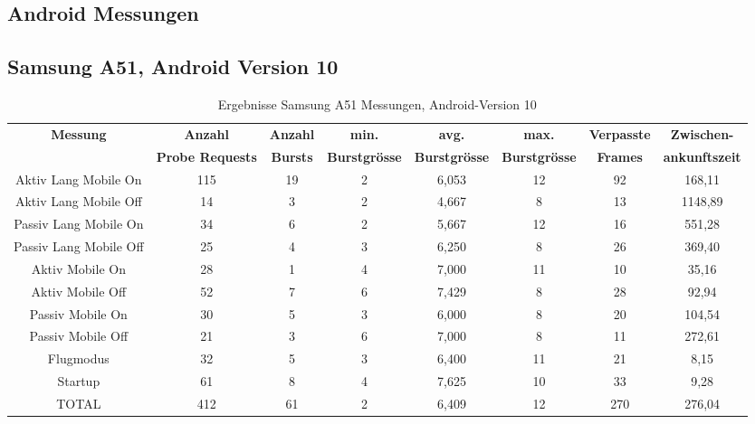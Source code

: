 \begin{landscape}
   \clearpage

   \section*{Android Messungen}
   \subsection*{Samsung A51, Android Version 10}
   \begin{table}[h!]
      \centering
      \begin{tabular}{|c|c|c|c|c|c|c|c|}
      \hline
      \textbf{Messung} & \textbf{Anzahl} & \textbf{Anzahl} & \textbf{min.} & \textbf{avg.} & \textbf{max.} & \textbf{Verpasste} & \textbf{Zwischen-}\\
      & \textbf{Probe Requests} & \textbf{Bursts} & \textbf{Burstgrösse} & \textbf{Burstgrösse} & \textbf{Burstgrösse} & \textbf{Frames} & \textbf{ankunftszeit}\\
      \hline
      Aktiv Lang Mobile On & 115 & 19 & 2 & 6,053 & 12 & \phantom{0}92 & \phantom{0}168,11 \\
      Aktiv Lang Mobile Off & \phantom{0}14 & \phantom{0}3 & 2 & 4,667 & \phantom{0}8 & \phantom{0}13 & 1148,89 \\
      Passiv Lang Mobile On & \phantom{0}34 & \phantom{0}6 & 2 & 5,667 & 12 & \phantom{0}16 & \phantom{0}551,28 \\
      Passiv Lang Mobile Off & \phantom{0}25 & \phantom{0}4 & 3 & 6,250 & \phantom{0}8 & \phantom{0}26 & \phantom{0}369,40 \\
      Aktiv Mobile On & \phantom{0}28 & \phantom{0}1 & 4 & 7,000 & 11 & \phantom{0}10 & \phantom{00}35,16 \\
      Aktiv Mobile Off & \phantom{0}52 & \phantom{0}7 & 6 & 7,429 & \phantom{0}8 & \phantom{0}28 & \phantom{00}92,94 \\
      Passiv Mobile On & \phantom{0}30 & \phantom{0}5 & 3 & 6,000 & \phantom{0}8 & \phantom{0}20 & \phantom{0}104,54 \\
      Passiv Mobile Off & \phantom{0}21 & \phantom{0}3 & 6 & 7,000 & \phantom{0}8 & \phantom{0}11 & \phantom{0}272,61 \\
      Flugmodus & \phantom{0}32 & \phantom{0}5 & 3 & 6,400 & 11 & \phantom{0}21 & \phantom{000}8,15 \\
      Startup & \phantom{0}61 & \phantom{0}8 & 4 & 7,625 & 10 & \phantom{0}33 & \phantom{000}9,28 \\
      \hline 
      TOTAL & 412 & 61 & 2 & 6,409 & 12 & 270 & \phantom{0}276,04 \\
      \hline
      \end{tabular}
      \caption{Ergebnisse Samsung A51 Messungen, Android-Version 10
      \label{table:samsungA51-10-results}} 
   \end{table}


\end{landscape}
